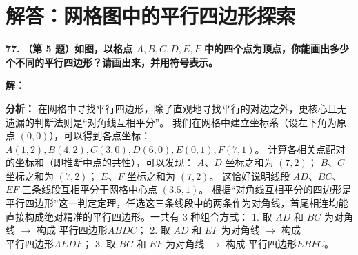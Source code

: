 \newpage


\section{解答：网格图中的平行四边形探索}

\vspace{0.6cm}

\textbf{\LARGE 77.} \textbf{（第 5 题）如图，以格点 $A, B, C, D, E, F$ 中的四个点为顶点，你能画出多少个不同的平行四边形？请画出来，并用符号表示。}

\vspace{0.4cm}
\textbf{解：}

\textbf{分析：} 在网格中寻找平行四边形，除了直观地寻找平行的对边之外，更核心且无遗漏的判断法则是“对角线互相平分”。
我们在网格中建立坐标系（设左下角为原点 $(0,0)$），可以得到各点坐标：
$A(1,2), B(4,2), C(3,0), D(6,0), E(0,1), F(7,1)$。
计算各相关点配对的坐标和（即推断中点的共性），可以发现：
$A$、$D$ 坐标之和为 $(7,2)$；
$B$、$C$ 坐标之和为 $(7,2)$；
$E$、$F$ 坐标之和为 $(7,2)$。
这恰好说明线段 $AD$、$BC$、$EF$ 三条线段互相平分于网格中心点 $(3.5, 1)$。
根据“对角线互相平分的四边形是平行四边形”这一判定定理，任选这三条线段中的两条作为对角线，首尾相连均能直接构成绝对精准的平行四边形。一共有 $3$ 种组合方式：
1. 取 $AD$ 和 $BC$ 为对角线 $\to$ 构成 $\text{平行四边形} ABDC$；
2. 取 $AD$ 和 $EF$ 为对角线 $\to$ 构成 $\text{平行四边形} AEDF$；
3. 取 $BC$ 和 $EF$ 为对角线 $\to$ 构成 $\text{平行四边形} EBFC$。

